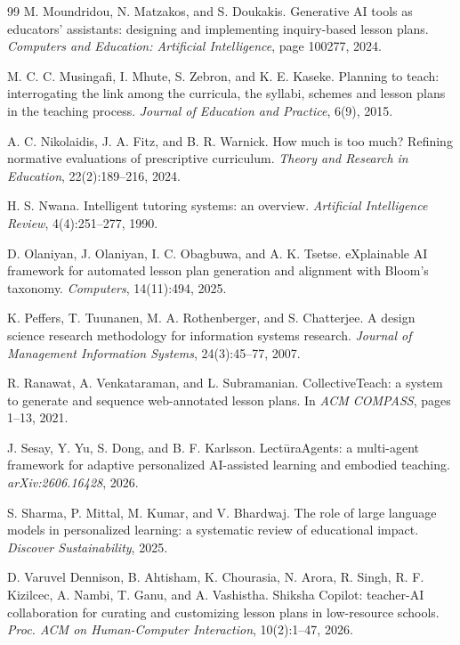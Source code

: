 \documentclass{article}
\begin{document}
\begin{thebibliography}{99}
 M. Moundridou, N. Matzakos, and S. Doukakis.
Generative AI tools as educators' assistants: designing and implementing inquiry-based lesson
plans. \emph{Computers and Education: Artificial Intelligence}, page 100277, 2024.

 M. C. C. Musingafi, I. Mhute, S. Zebron, and
K. E. Kaseke. Planning to teach: interrogating the link among the curricula, the syllabi, schemes
and lesson plans in the teaching process. \emph{Journal of Education and Practice}, 6(9), 2015.

 A. C. Nikolaidis, J. A. Fitz, and B. R. Warnick.
How much is too much? Refining normative evaluations of prescriptive curriculum. \emph{Theory and
Research in Education}, 22(2):189--216, 2024.

 H. S. Nwana. Intelligent tutoring systems: an overview.
\emph{Artificial Intelligence Review}, 4(4):251--277, 1990.

 D. Olaniyan, J. Olaniyan, I. C. Obagbuwa, and
A. K. Tsetse. eXplainable AI framework for automated lesson plan generation and alignment with
Bloom's taxonomy. \emph{Computers}, 14(11):494, 2025.

 K. Peffers, T. Tuunanen, M. A. Rothenberger, and
S. Chatterjee. A design science research methodology for information systems research.
\emph{Journal of Management Information Systems}, 24(3):45--77, 2007.

 R. Ranawat, A. Venkataraman, and L. Subramanian.
CollectiveTeach: a system to generate and sequence web-annotated lesson plans. In \emph{ACM
COMPASS}, pages 1--13, 2021.

 J. Sesay, Y. Yu, S. Dong, and B. F. Karlsson.
Lect\=uraAgents: a multi-agent framework for adaptive personalized AI-assisted learning and
embodied teaching. \emph{arXiv:2606.16428}, 2026.

 S. Sharma, P. Mittal, M. Kumar, and V. Bhardwaj. The
role of large language models in personalized learning: a systematic review of educational
impact. \emph{Discover Sustainability}, 2025.

 D. Varuvel Dennison, B. Ahtisham,
K. Chourasia, N. Arora, R. Singh, R. F. Kizilcec, A. Nambi, T. Ganu, and A. Vashistha. Shiksha
Copilot: teacher-AI collaboration for curating and customizing lesson plans in low-resource
schools. \emph{Proc. ACM on Human-Computer Interaction}, 10(2):1--47, 2026.


\end{thebibliography}
\end{document}
